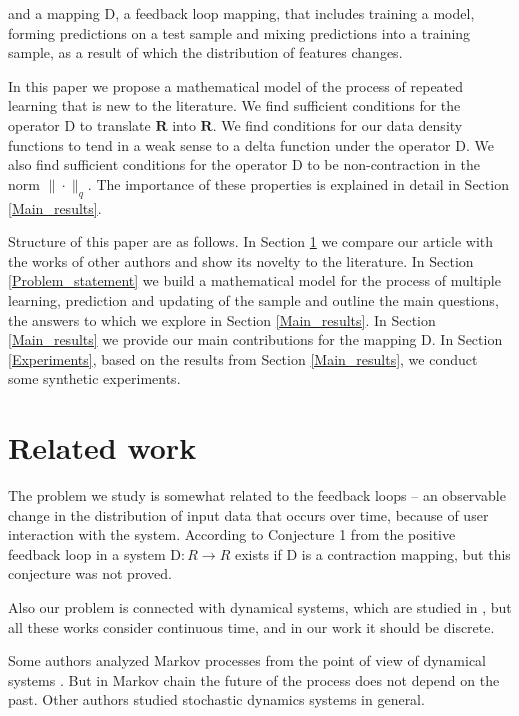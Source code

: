 \documentclass{article}
\begin{document}
    and a mapping $\text{D}$, a feedback loop mapping, that includes training a model, forming predictions on a test sample and mixing predictions into a training sample, as a result of which the distribution of features changes.

    In this paper we propose a mathematical model of the process of repeated learning that is new to the literature. We find sufficient conditions for the operator $\text{D}$ to translate $\mathbf{R}$ into $\mathbf{R}$. We find conditions for our data density functions to tend in a weak sense to a delta function under the operator $\text{D}$. We also find sufficient conditions for the operator $\text{D}$ to be non-contraction in the norm $\|\cdot \|_q$. The importance of these properties is explained in detail in Section \ref{Main_results}.
    
    Structure of this paper are as follows. In Section \ref{Related_work} we compare our article with the works of other authors and show its novelty to the literature. In Section \ref{Problem_statement} we build a mathematical model for the process of multiple learning, prediction and updating of the sample and outline the main questions, the answers to which we explore in Section \ref{Main_results}. In Section \ref{Main_results} we provide our main contributions for the mapping $\text{D}$. In Section \ref{Experiments}, based on the results from Section \ref{Main_results}, we conduct some synthetic experiments.

\section{Related work} \label{Related_work}    

    The problem we study is somewhat related to the feedback loops \cite{khritankov2021hidden, khritankov2021existence} -- an observable change in the distribution of input data that occurs over time, because of user interaction with the system. According to Conjecture 1 from \cite{khritankov2021hidden} the positive feedback loop in a system $\text{D} : R \rightarrow R$ exists if $\text{D}$ is a contraction mapping, but this conjecture was not proved.

    Also our problem is connected with dynamical systems, which are studied in \cite{katok1995introduction, nemytskii2015qualitative}, but all these works consider continuous time, and in our work it should be discrete.

    Some authors analyzed Markov processes from the point of view of dynamical systems \cite{tarlowski2017global, vershik2005does}. But in Markov chain the future of the process does not depend on the past. Other authors \cite{varvenne2019rate, pap1996fixed} studied stochastic dynamics systems in general.
\end{document}
